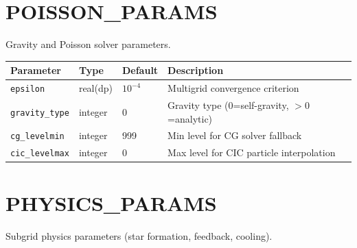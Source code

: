 \documentclass[11pt,fleqn]{book}
\begin{document}
\chapter{POISSON\_PARAMS}

Gravity and Poisson solver parameters.

\begin{longtable}{L{3.5cm} C{1.8cm} C{1.8cm} L{6cm}}
\toprule
\textbf{Parameter} & \textbf{Type} & \textbf{Default} & \textbf{Description} \\
\midrule
\endhead
\texttt{epsilon} & real(dp) & $10^{-4}$ & Multigrid convergence criterion \\
\texttt{gravity\_type} & integer & 0 & Gravity type (0=self-gravity, $>0$=analytic) \\
\texttt{cg\_levelmin} & integer & 999 & Min level for CG solver fallback \\
\texttt{cic\_levelmax} & integer & 0 & Max level for CIC particle interpolation \\
\bottomrule
\end{longtable}


\chapter{PHYSICS\_PARAMS}

Subgrid physics parameters (star formation, feedback, cooling).
\end{document}
